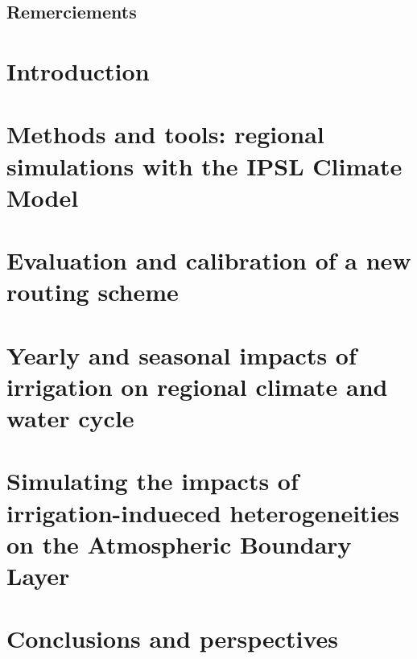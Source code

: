 \documentclass{report}
\begin{document}
\section*{Remerciements}

\clearpage
\dominitoc
\renewcommand*\contentsname{Contents}
\tableofcontents
\newpage

\chapter{Introduction}
\minitoc


\chapter{Methods and tools: regional simulations with the IPSL Climate Model}
\minitoc


\chapter{Evaluation and calibration of a new routing scheme}
\minitoc


\chapter{Yearly and seasonal impacts of irrigation on regional climate and water cycle}
\minitoc


\chapter{Simulating the impacts of irrigation-indueced heterogeneities on the Atmospheric Boundary Layer}
\minitoc


\chapter{Conclusions and perspectives}

\newpage

% 

\printbibliography


\listoffigures
\newpage
\listoftables
\end{document}
